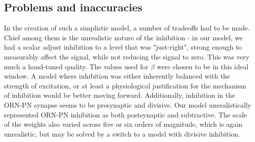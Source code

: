 \documentclass[a4paper,12pt,twoside]{article}
\begin{document}
\subsection{Problems and inaccuracies}
In the creation of such a simplistic model, a number of tradeoffs had to be made.  Chief among them is the unrealistic nature of the inhibition - in our model, we had a scalar adjust inhibition to a level that was "just-right", strong enough to measurably affect the signal, while not reducing the signal to zero.  This was very much a hand-tuned quality.  The values used for $\beta$ were chosen to be in this ideal window.  A model where inhibition was either inherently balanced with the strength of excitation, or at least a physiological justification for the mechanism of inhibition would be better moving forward.  Additionally, inhibition in the ORN-PN synapse seems to be presynaptic and divisive\cite{Nagel2015, Olsen2010}.  Our model unrealistically represented ORN-PN inhibition as both postsynaptic and subtractive.  The scale of the weights also varied across five or six orders of magnitude, which is again unrealistic, but may be solved by a switch to a model with divisive inhibition.

\FloatBarrier

\def\bibfont{\footnotesize}

\end{document}
